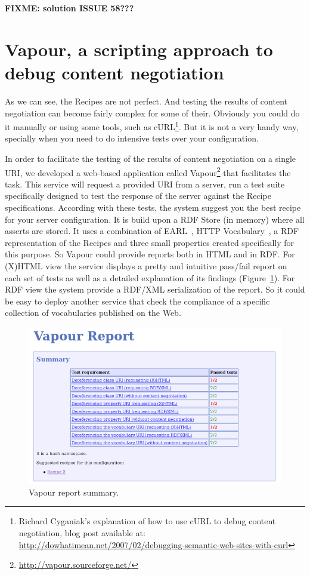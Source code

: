 \textbf{FIXME: solution ISSUE 58???}

\section{Vapour, a scripting approach to debug content negotiation} %

As we can see, the Recipes are not perfect. And testing the results of content 
negotiation can become fairly complex for some of their. Obviously you could do 
it manually or using some tools, such as 
cURL\footnote{Richard Cyganiak's explanation of how to use cURL to debug content negotiation, 
blog post available at: \url{http://dowhatimean.net/2007/02/debugging-semantic-web-sites-with-curl}}.
But it is not a very handy way, specially when you need to do intensive tests over your 
configuration.

In order to facilitate the testing of the results of content negotiation on a single 
URI, we developed a web-based application called Vapour\footnote{\url{http://vapour.sourceforge.net/}} 
that facilitates the task. This service will request a provided URI from a server, 
run a test suite specifically designed to test the response of the server against 
the Recipe specifications. According with these tests, the system suggest you the 
best recipe for your server configuration. It is build upon a RDF Store (in memory) 
where all asserts are stored. It uses a combination of EARL~\cite{EARL}, HTTP
Vocabulary~\cite{Koch2007}, a RDF representation of the Recipes and three small 
properties created specifically for this purpose. So Vapour could provide 
reports both in HTML and in RDF. For (X)HTML view the service displays a 
pretty and intuitive pass/fail report on each set of tests as  well as a detailed 
explanation of its  findings (Figure~\ref{fig:report-summary}).
For RDF view %
the system provide a RDF/XML serialization of the report. So it could be easy 
to deploy another service that check the compliance of a specific collection 
of vocabularies published on the Web.

\begin{figure}
 \centering
 \includegraphics[width=12cm]{images/report-summary.png}
 \caption{\label{fig:report-summary}Vapour report summary.}
\end{figure}

